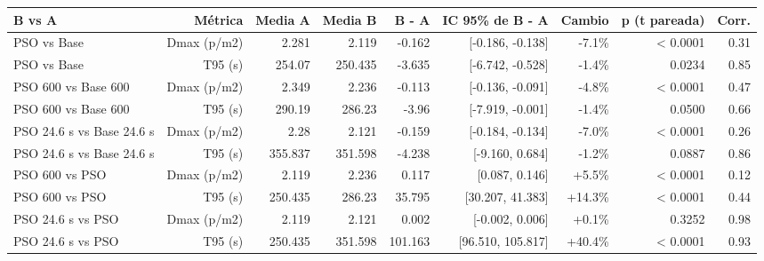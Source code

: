 \begin{tabular}{lrrrrrrrr}
\toprule
B vs A & Métrica & Media A & Media B & B - A & IC 95\% de B - A & Cambio & p (t pareada) & Corr. \\
\midrule
PSO vs Base & Dmax (p/m2) & 2.281 & 2.119 & -0.162 & [-0.186, -0.138] & -7.1\% & < 0.0001 & 0.31 \\
PSO vs Base & T95 (s) & 254.07 & 250.435 & -3.635 & [-6.742, -0.528] & -1.4\% & 0.0234 & 0.85 \\
PSO 600 vs Base 600 & Dmax (p/m2) & 2.349 & 2.236 & -0.113 & [-0.136, -0.091] & -4.8\% & < 0.0001 & 0.47 \\
PSO 600 vs Base 600 & T95 (s) & 290.19 & 286.23 & -3.96 & [-7.919, -0.001] & -1.4\% & 0.0500 & 0.66 \\
PSO 24.6 s vs Base 24.6 s & Dmax (p/m2) & 2.28 & 2.121 & -0.159 & [-0.184, -0.134] & -7.0\% & < 0.0001 & 0.26 \\
PSO 24.6 s vs Base 24.6 s & T95 (s) & 355.837 & 351.598 & -4.238 & [-9.160, 0.684] & -1.2\% & 0.0887 & 0.86 \\
PSO 600 vs PSO & Dmax (p/m2) & 2.119 & 2.236 & 0.117 & [0.087, 0.146] & +5.5\% & < 0.0001 & 0.12 \\
PSO 600 vs PSO & T95 (s) & 250.435 & 286.23 & 35.795 & [30.207, 41.383] & +14.3\% & < 0.0001 & 0.44 \\
PSO 24.6 s vs PSO & Dmax (p/m2) & 2.119 & 2.121 & 0.002 & [-0.002, 0.006] & +0.1\% & 0.3252 & 0.98 \\
PSO 24.6 s vs PSO & T95 (s) & 250.435 & 351.598 & 101.163 & [96.510, 105.817] & +40.4\% & < 0.0001 & 0.93 \\
\bottomrule
\end{tabular}
